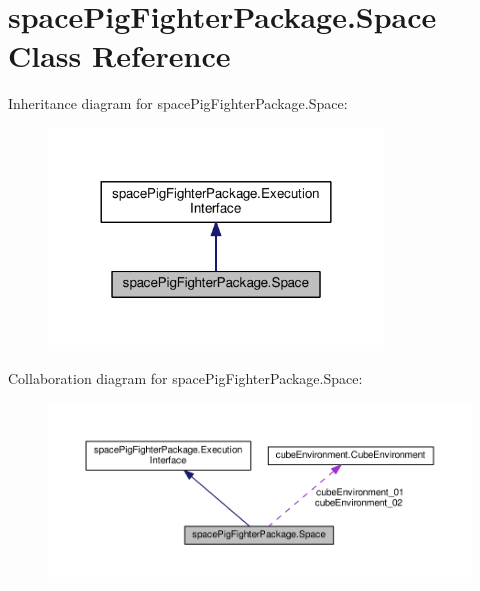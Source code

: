\hypertarget{classspace_pig_fighter_package_1_1_space}{}\section{space\+Pig\+Fighter\+Package.\+Space Class Reference}
\label{classspace_pig_fighter_package_1_1_space}


Inheritance diagram for space\+Pig\+Fighter\+Package.\+Space\+:\nopagebreak
\begin{figure}[H]
\begin{center}
\leavevmode
\includegraphics[width=252pt]{classspace_pig_fighter_package_1_1_space__inherit__graph}
\end{center}
\end{figure}


Collaboration diagram for space\+Pig\+Fighter\+Package.\+Space\+:\nopagebreak
\begin{figure}[H]
\begin{center}
\leavevmode
\includegraphics[width=350pt]{classspace_pig_fighter_package_1_1_space__coll__graph}
\end{center}
\end{figure}
